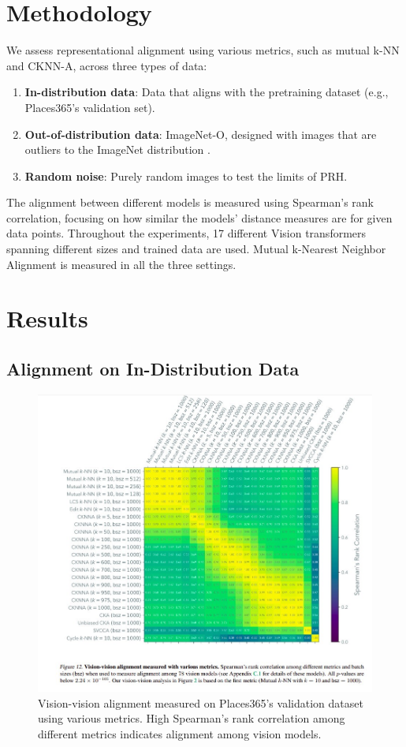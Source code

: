 \documentclass[10pt,a4paper]{article}
\begin{document}
\section{Methodology}
We assess representational alignment using various metrics, such as mutual k-NN and CKNN-A, across three types of data:
\begin{enumerate}
    \item \textbf{In-distribution data}: Data that aligns with the pretraining dataset (e.g., Places365’s validation set).
    \item \textbf{Out-of-distribution data}: ImageNet-O, designed with images that are outliers to the ImageNet distribution \cite{hendrycks2021nae}.
    \item \textbf{Random noise}: Purely random images to test the limits of PRH.
\end{enumerate}
The alignment between different models is measured using Spearman's rank correlation, focusing on how similar the models' distance measures are for given data points. Throughout the experiments, 17 different Vision transformers spanning different sizes and trained data are used. Mutual k-Nearest Neighbor Alignment is measured in all the three settings.

\section{Results}

\subsection{Alignment on In-Distribution Data}
\begin{figure}[H]
    \centering
    \includegraphics[width=\textwidth]{prh_correlation.jpg}
    \caption{Vision-vision alignment measured on Places365’s validation dataset using various metrics. High Spearman's rank correlation among different metrics indicates alignment among vision models.}
    \label{fig:prh_correlation}
\end{figure}
\end{document}
